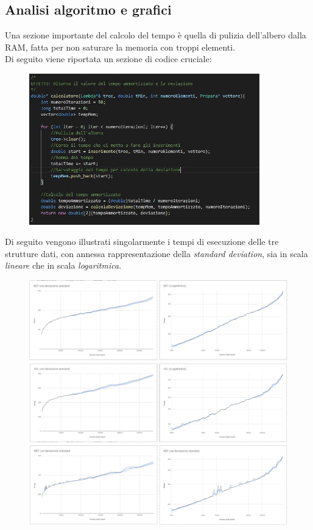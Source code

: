 \documentclass[a4paper]{article}
\begin{document}
		\subsection{Analisi algoritmo e grafici}
		Una sezione importante del calcolo del tempo è quella di pulizia dell'albero dalla RAM, fatta per non saturare la memoria con troppi elementi.\\
		Di seguito viene riportata un sezione di codice cruciale: 
		\begin{figure}[ht]
			\includegraphics[width=10cm]{Descrizione}
		\end{figure}
		\newpage
		Di seguito vengono illustrati singolarmente i tempi di esecuzione delle tre strutture dati, con annessa rappresentazione della \textit{standard deviation}, sia in scala \textit{lineare} che in scala \textit{logaritmica}.\\
		\begin{figure}[ht]
			\includegraphics[width=15cm]{BST}
			\includegraphics[width=15cm]{AVL}
			\includegraphics[width=15cm]{RBT}
		\end{figure}
		
\end{document}
